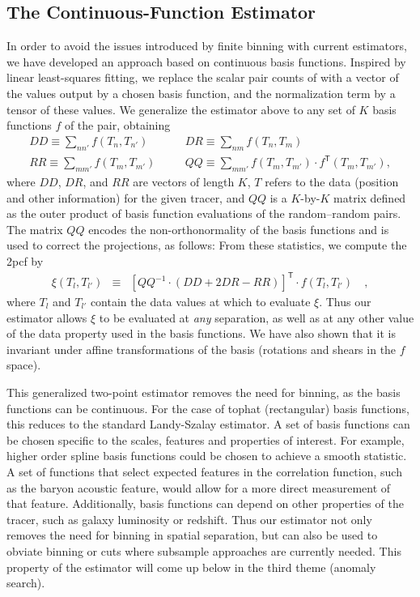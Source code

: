 \documentclass[12pt, fullpage, letterpaper]{article}
\newcommand{\cf}{2pcf\xspace}
\newcommand{\LS}{\acronym{LS}\xspace}
\newcommand{\inv}{^{-1}}
\newcommand{\T}{^{\mathsf{T}}}
\begin{document}
\subsection{The Continuous-Function Estimator}

In order to avoid the issues introduced by finite binning with current estimators, we have developed an approach based on continuous basis functions. 
Inspired by linear least-squares fitting, we replace the scalar pair counts of \LS with a vector of the values output by a chosen basis function, and the normalization term by a tensor of these values.
We generalize the \LS estimator above to any set of $K$ basis functions $f$ of the pair, obtaining
\begin{eqnarray}\displaystyle
DD \equiv \sum_{n n'} f(T_n, T_{n'}) &\quad&
DR \equiv \sum_{n m} f(T_n, T_{m}) \nonumber\\
RR \equiv \sum_{m m'} f(T_m, T_{m'}) &\quad&
QQ \equiv \sum_{m m'} f(T_m, T_{m'}) \cdot f\T(T_m, T_{m'}),
\end{eqnarray}
where $DD$, $DR$, and $RR$ are vectors of length $K$, $T$ refers to the data (position and other information) for the given tracer, and $QQ$ is a $K$-by-$K$ matrix defined as the outer product of basis function evaluations of the random--random pairs.
The matrix $QQ$ encodes the non-orthonormality of the basis functions and is used to correct the projections, as follows:
From these statistics, we compute the \cf by
\begin{eqnarray}\displaystyle
\xi(T_l, T_{l'}) &\equiv& [QQ\inv \cdot (DD + 2DR - RR)]\T \cdot f(T_l, T_{l'}) \quad ,
\end{eqnarray}
where $T_l$ and $T_{l'}$ contain the data values at which to evaluate $\xi$.
Thus our estimator allows $\xi$ to be evaluated at \emph{any} separation, as well as at any other value of the data property used in the basis functions.
We have also shown that it is invariant under affine transformations of the basis (rotations and shears in the $f$ space).

This generalized two-point estimator removes the need for binning, as the basis functions can be continuous.
For the case of tophat (rectangular) basis functions, this reduces to the standard Landy-Szalay estimator.
A set of basis functions can be chosen specific to the scales, features and properties of interest.
For example, higher order spline basis functions could be chosen to achieve a smooth statistic. 
A set of functions that select expected features in the correlation function, such as the baryon acoustic feature, would allow for a more direct measurement of that feature.
Additionally, basis functions can depend on other properties of the tracer, such as galaxy luminosity or redshift.
Thus our estimator not only removes the need for binning in spatial separation, but can also be used to obviate binning or cuts where subsample approaches are currently needed.
This property of the estimator will come up below in the third theme (anomaly search).
\end{document}
